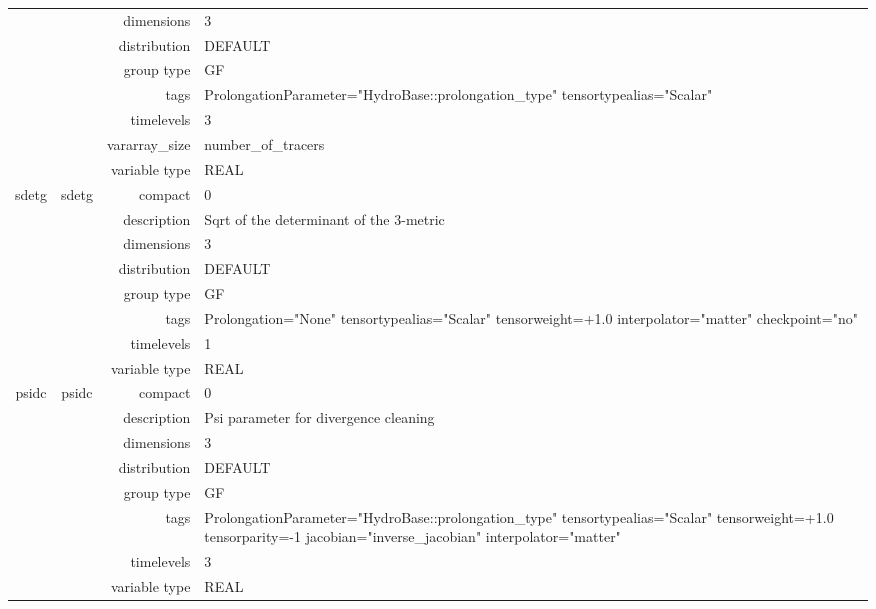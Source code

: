 \documentclass{article}
\begin{document}
\begin{tabular*}{150mm}{|c|c@{\extracolsep{\fill}}|rl|}
 &  & dimensions & 3 \\ 
 &  & distribution & DEFAULT \\ 
 &  & group type & GF \\ 
 &  & tags & ProlongationParameter="HydroBase::prolongation\_type" tensortypealias="Scalar" \\ 
 &  & timelevels & 3 \\ 
 &  & vararray\_size & number\_of\_tracers \\ 
 &  & variable type & REAL \\ 
\hline 
sdetg & sdetg & compact & 0 \\ 
 &  & description & Sqrt of the determinant of the 3-metric \\ 
 &  & dimensions & 3 \\ 
 &  & distribution & DEFAULT \\ 
 &  & group type & GF \\ 
 &  & tags & Prolongation="None" tensortypealias="Scalar" tensorweight=+1.0 interpolator="matter" checkpoint="no" \\ 
 &  & timelevels & 1 \\ 
 &  & variable type & REAL \\ 
\hline 
psidc & psidc & compact & 0 \\ 
 &  & description & Psi parameter for divergence cleaning \\ 
 &  & dimensions & 3 \\ 
 &  & distribution & DEFAULT \\ 
 &  & group type & GF \\ 
 &  & tags & ProlongationParameter="HydroBase::prolongation\_type" tensortypealias="Scalar" tensorweight=+1.0 tensorparity=-1 jacobian="inverse\_jacobian" interpolator="matter" \\ 
 &  & timelevels & 3 \\ 
 &  & variable type & REAL \\ 
\hline 
\end{tabular*} 



\vspace{5mm}
\vspace{5mm}
\end{document}
